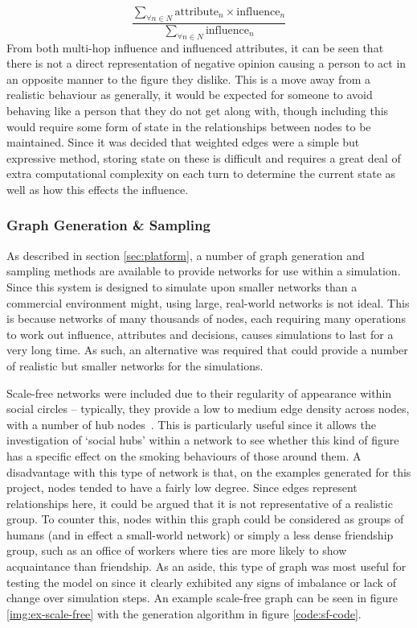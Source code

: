 \documentclass[]{report}
\begin{document}
\begin{equation}
\label{eq:inf-attr}
\frac{\sum_{\forall n \in N} \text{attribute}_{n} \times \text{influence}_{n}}{\sum_{\forall n \in N}\text{influence}_{n}}
\end{equation}
From both multi-hop influence and influenced attributes, it can be seen that there is not a direct representation of negative opinion causing a person to act in an opposite manner to the figure they dislike. This is a move away from a realistic behaviour as generally, it would be expected for someone to avoid behaving like a person that they do not get along with, though including this would require some form of state in the relationships between nodes to be maintained. Since it was decided that weighted edges were a simple but expressive method, storing state on these is difficult and requires a great deal of extra computational complexity on each turn to determine the current state as well as how this effects the influence.

\subsubsection{Graph Generation \& Sampling}
\label{sec:GGS}
As described in section \ref{sec:platform}, a number of graph generation and sampling methods are available to provide networks for use within a simulation. Since this system is designed to simulate upon smaller networks than a commercial environment might, using large, real-world networks is not ideal. This is because networks of many thousands of nodes, each requiring many operations to work out influence, attributes and decisions, causes simulations to last for a very long time. As such, an alternative was required that could provide a number of realistic but smaller networks for the simulations.

Scale-free networks were included due to their regularity of appearance within social circles – typically, they provide a low to medium edge density across nodes, with a number of hub nodes~\cite{BA-SciAm}. This is particularly useful since it allows the investigation of `social hubs' within a network to see whether this kind of figure has a specific effect on the smoking behaviours of those around them. A disadvantage with this type of network is that, on the examples generated for this project, nodes tended to have a fairly low degree. Since edges represent relationships here, it could be argued that it is not representative of a realistic group. To counter this, nodes within this graph could be considered as groups of humans (and in effect a small-world network) or simply a less dense friendship group, such as an office of workers where ties are more likely to show acquaintance than friendship. As an aside, this type of graph was most useful for testing the model on since it clearly exhibited any signs of imbalance or lack of change over simulation steps. An example scale-free graph can be seen in figure \ref{img:ex-scale-free} with the generation algorithm in figure \ref{code:sf-code}.
\end{document}
